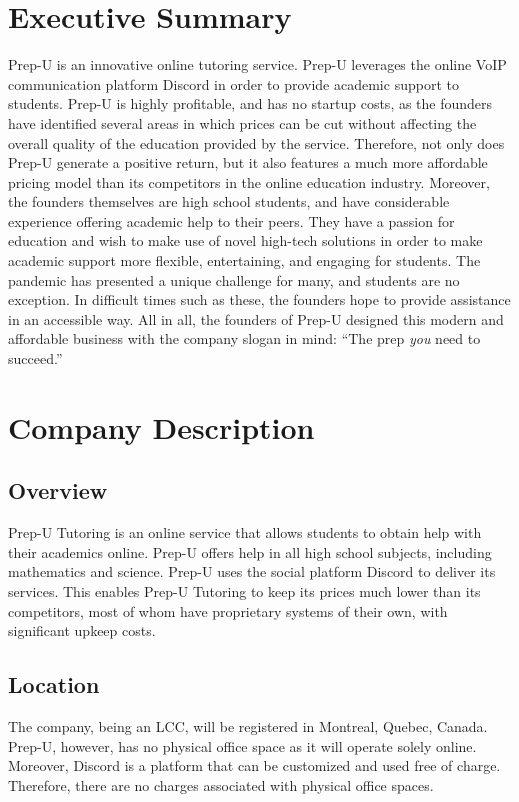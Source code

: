 \documentclass{business}
\begin{document}
    \maketitle
    \tableofcontents
    \newpage
    \section{Executive Summary}
    Prep-U is an innovative online tutoring service. Prep-U leverages the online VoIP communication platform Discord in order to provide academic support to students. Prep-U is highly profitable, and has no startup costs, as the founders have identified several areas in which prices can be cut without affecting the overall quality of the education provided by the service. Therefore, not only does Prep-U generate a positive return, but it also features a much more affordable pricing model than its competitors in the online education industry. Moreover, the founders themselves are high school students, and have considerable experience offering academic help to their peers. They have a passion for education and wish to make use of novel high-tech solutions in order to make academic support more flexible, entertaining, and engaging for students. The pandemic has presented a unique challenge for many, and students are no exception. In difficult times such as these, the founders hope to provide assistance in an accessible way. All in all, the founders of Prep-U designed this modern and affordable business with the company slogan in mind: ``The prep \emph{you} need to succeed.''
    \section{Company Description}
    \subsection{Overview}
    Prep-U Tutoring is an online service that allows students to obtain help with their academics online. Prep-U offers help in all high school subjects, including mathematics and science. Prep-U uses the social platform Discord to deliver its services. This enables Prep-U Tutoring to keep its prices much lower than its competitors, most of whom have proprietary systems of their own, with significant upkeep costs.
    \subsection{Location}
    The company, being an LCC, will be registered in Montreal, Quebec, Canada. Prep-U, however, has no physical office space as it will operate solely online. Moreover, Discord is a platform that can be customized and used free of charge. Therefore, there are no charges associated with physical office spaces. 
\end{document}
